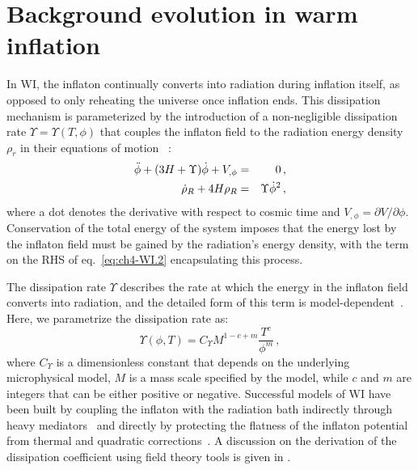 \section{Background evolution in warm inflation
\label{sec:ch4-background_ev}}

In WI, the inflaton continually converts into radiation during inflation itself, as opposed to only reheating the universe once inflation ends. This dissipation mechanism is parameterized by the introduction of a non-negligible dissipation rate $\Upsilon = \Upsilon(T,\phi)$ that couples the inflaton field to the radiation energy density $\rho_r$ in their equations of motion ~\cite{Berera:1995wh, Berera:1995ie}:
\begin{eqnarray}
    \Ddot{\phi}+(3H+\Upsilon)\dot{\phi}+V_{,\phi} &=& 0\,,\label{eq:ch4-WI.1}\\
    \Dot{\rho}_R+4H\rho_R &=& \Upsilon \Dot{\phi}^2\,,  \label{eq:ch4-WI.2}
\end{eqnarray}
where a dot denotes the derivative with respect to cosmic time and $V_{,\phi}=\partial V/\partial \phi$. Conservation of the total energy of the system imposes that the energy lost by the inflaton field must be gained by the radiation's energy density, with the term on the RHS of eq.~\eqref{eq:ch4-WI.2} encapsulating this process.

The dissipation rate $\Upsilon$ describes the rate at which the energy in the inflaton field converts into radiation, and the detailed form of this term is model-dependent~\cite{Berera:1998gx, Yokoyama:1998ju}. Here, we parametrize the dissipation rate as:
\begin{equation}
    \Upsilon(\phi, T)=C_\Upsilon M^{1-c+m} \frac{T^c}{\phi^m}\,,
    \label{eq:ch4-Upsilon}
\end{equation}
where $C_\Upsilon$ is a dimensionless constant that depends on the underlying microphysical model, $M$ is a mass scale specified by the model, while $c$ and $m$ are integers that can be either positive or negative. Successful models of WI have been built by coupling the inflaton with the radiation bath indirectly through heavy mediators~\cite{Berera:2002sp, Moss:2006gt, Berera:2008ar} and directly by protecting the flatness of the inflaton potential from thermal and quadratic corrections~\cite{Bastero-Gil:2016qru, Bastero-Gil:2019gao, Berghaus:2019whh}. A discussion on the derivation of the dissipation coefficient using field theory tools is given in \cite{Bastero-Gil:2010dgy}.

